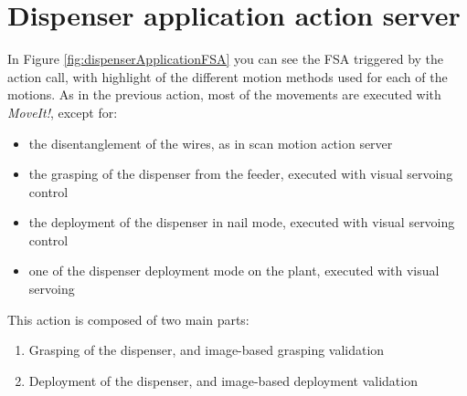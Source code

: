 \section{Dispenser application action server}\label{sec:dispenserApplicationImplementation}

In Figure \ref{fig:dispenserApplicationFSA} you can see the \ac{FSA} triggered by the action call, with highlight of the different motion methods used for each of the motions. As in the previous action, most of the movements are executed with \textit{MoveIt!}, except for:
\begin{itemize}
	\item the disentanglement of the wires, as in scan motion action server
	\item the grasping of the dispenser from the feeder, executed with visual servoing control
	\item the deployment of the dispenser in nail mode, executed with visual servoing control
	\item one of the dispenser deployment mode on the plant, executed with visual servoing
\end{itemize}
This action is composed of two main parts:
\begin{enumerate}
	\item Grasping of the dispenser, and image-based grasping validation
	\item Deployment of the dispenser, and image-based deployment validation
\end{enumerate}


